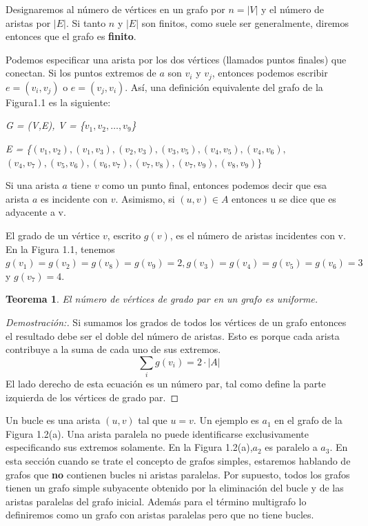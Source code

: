\documentclass[10pt,a5paper]{book}
\newtheorem{teorema}{Teorema}[chapter]
\begin{document}
Designaremos al número de vértices en un grafo por $n = |V|$ y el número de aristas por $|E|$. Si tanto $n$ y $|E|$ son finitos, como suele ser generalmente, diremos entonces que el grafo es \textbf{finito}.

Podemos especificar una arista por los dos vértices (llamados puntos finales) que conectan. Si los puntos extremos de $a$ son $v_i$ y $v_j$, entonces podemos escribir $e = (v_i,v_j)$ o $e = (v_j,v_i)$. Así, una definición equivalente del grafo de la Figura1.1 es la siguiente:

\emph{ G = (V,E), V = \{$v_1,v_2, \ldots,v_9$\}} \newline
\begin{center}
  \emph{ E = \{$(v_1,v_2),(v_1,v_3),(v_2,v_3),(v_3,v_5),(v_4,v_5),(v_4,v_6),$}\newline
  \emph{$       (v_4,v_7),(v_5,v_6),(v_6,v_7),(v_7,v_8),(v_7,v_9),(v_8,v_9)\}$}
\end{center}

Si una arista $a$ tiene $v$ como un punto final, entonces podemos decir que esa arista $a$ es incidente con $v$. Asimismo, si $(u,v)\in A$ entonces u se dice que es adyacente a v.

El grado de un vértice $v$, escrito $g(v)$, es el número de aristas incidentes con v. En la Figura 1.1, tenemos $g(v_1) = g(v_2) = g(v_8) = g(v_9) = 2, g(v_3) = g(v_4) = g(v_5) = g(v_6) = 3$ y $g(v_7) = 4$.

\begin{teorema}
  El número de vértices de grado par en un grafo es uniforme. \end{teorema}

\begin{proof}[Demostración:] Si sumamos los grados de todos los vértices de un grafo entonces el resultado debe ser el doble del número de aristas. Esto es porque cada arista contribuye a la suma de cada uno de sus extremos.
  \[ \sum_{i} g(v_{i}) = 2\cdot |A| \]
  El lado derecho de esta ecuación es un número par, tal como define la parte izquierda de los vértices de grado par.\end{proof}

Un bucle es una arista $(u,v)$ tal que $u=v$. Un ejemplo es $a_1$ en el grafo de la Figura 1.2(a). Una arista paralela no puede identificarse exclusivamente especificando sus extremos solamente. En la Figura 1.2(a),$a_2$ es paralelo a $a_3$. En esta sección cuando se trate el concepto de grafos simples, estaremos hablando de grafos que \textbf{no} contienen bucles ni aristas paralelas. Por supuesto, todos los grafos tienen un grafo simple subyacente obtenido por la eliminación del bucle y de las aristas paralelas del grafo inicial. Además para el término multigrafo lo definiremos como un grafo con aristas paralelas pero que no tiene bucles.\newline
\end{document}
